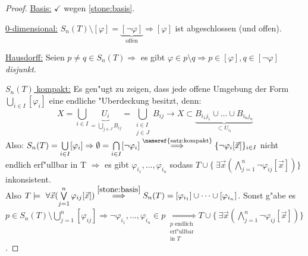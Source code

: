 \documentclass[a4paper,12pt,numbers=noenddot,parskip=full]{scrartcl}
\newcommand{\Forall}{~\forall}
\newcommand{\Exists}{~\exists}
\theoremstyle{dotless}
\begin{document}
\begin{proof}
	\underline{Basis:} $\checkmark$ wegen \eqref{stone:basis}.
	
	\underline{0-dimensional:} $S_n(T) \setminus [\varphi] = \underbrace{[\lnot \varphi]}_\text{offen} \Rightarrow [\varphi]$ ist abgeschlossen (und offen).
	
	\underline{Hausdorff:} Seien $p \neq q \in S_n(T) \Rightarrow$ es gibt $\varphi \in p \setminus q \Rightarrow p \in [\varphi], q \in [\lnot \varphi]$ \emph{disjunkt}.
	
	\underline{$S_n(T)$ kompakt:} Es gen"ugt zu zeigen, dass jede offene Umgebung der Form $\bigcup\limits_{i \in I}[\varphi_i]$ eine endliche "Uberdeckung besitzt, denn:
	\begin{equation*}
		X = \bigcup\limits_{i \in I} \underbrace{U_i}_{= \bigcup\limits_{j \in J} B_{ij}} = \bigcup\limits_{\substack{i \in I\\j \in J}} B_{ij} \longrightarrow X \subset \underbrace{B_{i_1 j_1} \cup \dots \cup B_{i_n j_n}}_{\subset U_{i_1}}
	\end{equation*}
	Also: $S_n(T) = \bigcup\limits_{i \in I} [\varphi_i] \Rightarrow \emptyset = \bigcap\limits_{i \in I} [\lnot\varphi_i] \overset{\text{\nameref{satz:kompakt}}}{\Longrightarrow} \{\lnot \varphi_i[\vec{x}] \}_{i \in I}$ nicht endlich erf"ullbar in T $\Rightarrow$ es gibt $\varphi_{i_1}, \dots, \varphi_{i_n}$ sodass $T \cup \{\Exists \vec{x} (\bigwedge\limits_{j=1}^n \lnot \varphi_{ij}[\vec{x}]) \}$ inkonsistent.\\
	Also $T \models \Forall \vec{x} (\bigvee\limits_{j=1}^n \varphi_{ij}[\vec{x}]) \overset{\eqref{stone:basis}}{\Longrightarrow} S_n(T) = [\varphi_{i_1}] \cup \dots \cup [\varphi_{i_n}]$. Sonst g"abe es $p \in S_n(T)\setminus \bigcup\limits_{j=1}^n [\varphi_{ij}] \Rightarrow \lnot\varphi_{i_1}, \dots, \varphi_{i_n} \in p \underset{\substack{p\text{ endlich}\\\text{erf"ullbar}\\\text{in }T}}{\Longrightarrow} T \cup \{\Exists \vec{x}(\bigwedge\limits_{j=1}^n \lnot \varphi_{ij}[\vec{x}]) \}$.
\end{proof}
\end{document}
